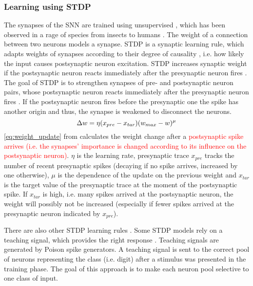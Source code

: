 \subsubsection{Learning using \ac{STDP}}
The synapses of the \ac{SNN} are trained using unsupervised , which has been observed in a rage of species from insects to humans \cite{STDP_hebbian}. 
The weight of a connection between two neurons models a synapse.
\ac{STDP} is a synaptic learning rule, which adapts weights of synapses according to their degree of causality \cite{STDP_like},
 i.e. how likely the input causes postsynaptic neuron excitation.
\ac{STDP} increases synaptic weight if the postsynaptic neuron reacts immediately after the presynaptic neuron fires \cite{object_detection_SNN}.
The goal of \ac{STDP} is to strengthen synapses of pre- and postsynaptic neuron pairs, 
whose postsynaptic neuron reacts immediately after the presynaptic neuron fires \cite{object_detection_SNN}.
If the postsynaptic neuron fires before the presynaptic one the spike has another origin and thus, the synapse is weakened to disconnect the neurons.
%
\begin{equation}
    \centering
    \label{eq:weight_update}
    \Delta w = \eta (x_{pre} - x_{tar})(w_{max}-w)^\mu
\end{equation}
%
\autoref{eq:weight_update} from \cite{SNN} calculates the weight change after a \textcolor{red}{postsynaptic spike arrives 
(i.e. the synapses' importance is changed according to its influence on the postsynaptic neuron)}.
$\eta$ is the learning rate, presynaptic trace $x_{pre}$ tracks the number of recent presynaptic spikes 
(decaying if no spike arrives, increased by one otherwise), 
$\mu$ is the dependence of the update on the previous weight and 
$x_{tar}$ is the target value of the presynaptic trace at the moment of the postsynaptic spike.
If $x_{tar}$ is high, i.e. many spikes arrived at the postsynaptic neuron, the weight will possibly not be increased 
(especially if fewer spikes arrived at the presynaptic neuron indicated by  $x_{pre}$).

There are also other \ac{STDP} learning rules \cite{SNN}.
Some \ac{STDP} models rely on a teaching signal, which provides the right response \cite{STDP_like}.
Teaching signals are generated by Poison spike generators.
A teaching signal is sent to the correct pool of neurons representing the class (i.e. digit) after a stimulus was presented in the training phase.
The goal of this approach is to make each neuron pool selective to one class of input.


